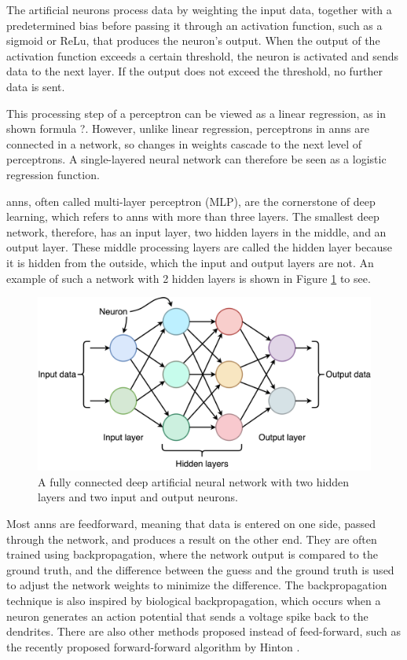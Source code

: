     The artificial neurons process data by weighting the input data, together with a predetermined bias before passing it through an activation function, such as a sigmoid or ReLu, that produces the neuron's output. When the output of the activation function exceeds a certain threshold, the neuron is activated and sends data to the next layer. If the output does not exceed the threshold, no further data is sent.
    
    This processing step of a perceptron can be viewed as a linear regression, as in shown formula ?. However, unlike linear regression, perceptrons in \glspl{ann} are connected in a network, so changes in weights cascade to the next level of perceptrons. A single-layered neural network can therefore be seen as a logistic regression function.
    
   \glspl{ann}, often called multi-layer perceptron (MLP), are the cornerstone of deep learning, which refers to \glspl{ann} with more than three layers. The smallest deep network, therefore, has an input layer, two hidden layers in the middle, and an output layer. These middle processing layers are called the hidden layer because it is hidden from the outside, which the input and output layers are not. An example of such a network with 2 hidden layers is shown in Figure \ref{fig:deep_network} to see. 


    \begin{figure}[htb]
        \centering
        \includegraphics[width=\linewidth]{images/deep_neural_network.png}
        \caption{A fully connected deep artificial neural network with two hidden layers and two input and output neurons.}
        \label{fig:deep_network}
    \end{figure}

   
    
    Most \glspl{ann} are feedforward, meaning that data is entered on one side, passed through the network, and produces a result on the other end. They are often trained using backpropagation, where the network output is compared to the ground truth, and the difference between the guess and the ground truth is used to adjust the network weights to minimize the difference. The backpropagation technique is also inspired by biological backpropagation, which occurs when a neuron generates an action potential that sends a voltage spike back to the dendrites. There are also other methods proposed instead of feed-forward, such as the recently proposed forward-forward algorithm by Hinton \cite{hintonForwardForwardAlgorithmPreliminary2022}.
    

